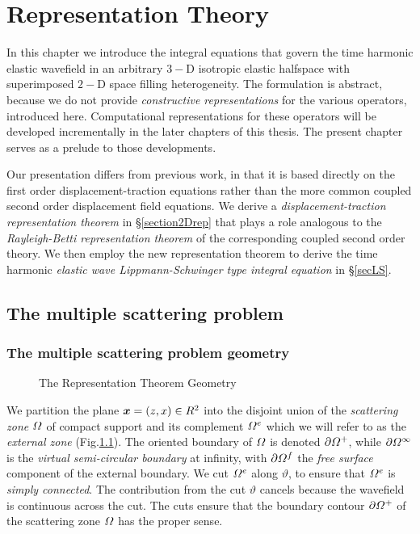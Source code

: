 \chapter{ Representation Theory}\label{MSrep}

In this  chapter we introduce the integral equations that govern the 
time harmonic elastic wavefield  
in an arbitrary $3-$D isotropic elastic halfspace with superimposed
$2-$D space filling heterogeneity. The formulation is abstract, because we 
do not provide {\em constructive representations\/} for the various  
operators, introduced here. 
Computational representations for these operators will be developed 
incrementally in the later chapters of this thesis. The present chapter 
serves as a prelude to those developments.

Our presentation differs from previous work, in that it is based 
directly on the first order displacement-traction equations rather than the 
more common coupled second order displacement field equations. 
We derive a {\em displacement-traction representation theorem\/} in 
\S\ref{section2Drep} that plays a role analogous to the {\em Rayleigh-Betti representation 
theorem\/} of the corresponding coupled second order theory. We then 
employ the new representation theorem to derive the time harmonic {\em 
elastic wave Lippmann-Schwinger type integral equation \/} in \S\ref{secLS}.




 
\section{The multiple scattering problem}

\subsection{The multiple scattering problem geometry}

\begin{figure}
\HideDisplacementBoxes
\centerline{}
\caption{The Representation Theorem Geometry}
\protect\label{MSRep1}
\end{figure}

We partition the plane ${\mbox{\boldmath$\mit x$\unboldmath}}=(z,x)\in{ R}^{2}$ into
the disjoint union of the {\em scattering zone} ${\mit \Omega}$ of compact support and its
complement ${\mit \Omega}^{e}$ which we will
refer to as the {\em external zone} (Fig.\ref{MSRep1}). The oriented 
boundary of ${\mit \Omega}$ is denoted $\partial {\mit \Omega}^{+}$, 
while $\partial {\mit \Omega}^{\infty}$ is the {\em virtual semi-circular 
boundary\/} at infinity, with $\partial {\mit \Omega}^{f}$ the {\em free surface\/} component of 
the external boundary.  We 
cut ${\mit \Omega}^{e}$ along $\vartheta$, to ensure that ${\mit \Omega}^{e}$ is 
{\em simply connected}. The contribution from the cut $\vartheta$ 
cancels because the wavefield is continuous across the cut. The 
cuts ensure  that the boundary contour 
$\partial{\mit \Omega}^{+}$ of the scattering zone ${\mit \Omega}$ has 
the proper sense. 

